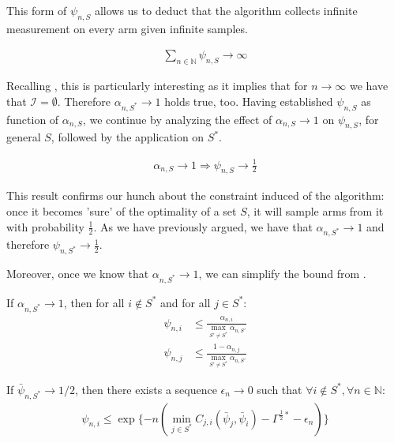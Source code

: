 This form of $\psi_{n, S}$ allows us to deduct that the algorithm collects infinite measurement on every arm given infinite samples.
\begin{lemma}\label{lemma:infinite_measurement}
  \begin{align}
    \sum_{n \in \mathbb{N}} \psi_{n, S} \rightarrow \infty
  \end{align}
\end{lemma}
Recalling , this is particularly interesting as
it implies that for $n \rightarrow \infty$ we have that $\mathcal{I} =
\emptyset$. Therefore $\alpha_{n, S^*} \rightarrow 1$ holds true, too. Having
established $\psi_{n, S}$ as function of $\alpha_{n, S}$, we continue by
analyzing the effect of $\alpha_{n, S} \rightarrow 1$ on $\psi_{n, S}$, for
general $S$, followed by the application on $S^*$.
\begin{lemma}\label{lemma:psi_convergence}
  \begin{align}
    \alpha_{n, S} \rightarrow 1 \Rightarrow \psi_{n, S} \rightarrow \frac{1}{2}
  \end{align}
\end{lemma}
This result confirms our hunch about the constraint induced of the algorithm:
once it becomes 'sure' of the optimality of a set $S$, it will sample arms from
it with probability $\frac{1}{2}$. As we have previously argued, we have that
$\alpha_{n, S^*} \rightarrow 1$ and therefore $\psi_{n, S^*} \rightarrow
\frac{1}{2}$.

Moreover, once we know that $\alpha_{n, S^*} \rightarrow 1$, we can simplify the
bound from .
\begin{lemma}\label{lemma:measurement_plan_bound_max}
  If $\alpha_{n, S^*} \rightarrow 1$, then for all $i \notin S^*$ and for all
  $j \in S^*$:
  \begin{align}
    \psi_{n, i} &\leq \frac{\alpha_{n, i}}{\max_{S' \neq S^*} \alpha_{n, S'}} \\
    \psi_{n, j} &\leq \frac{1 - \alpha_{n, j}}{\max_{S' \neq S^*} \alpha_{n,
        S'}}
  \end{align}
\end{lemma}

\begin{lemma}\label{lemma:fraction_bound}
  If $\bar{\psi}_{n, S^*} \rightarrow 1/2$, then there exists a sequence
  $\epsilon_n \rightarrow 0$ such that $\forall i \notin S^*, \forall n \in
  \mathbb{N}$:
  \begin{align}
    \psi_{n, i} \leq \exp\{-n( \min_{j \in S^*} C_{j, i}(\bar{\psi}_j,
        \bar{\psi}_i) - \Gamma^{\frac{1}{2}*} - \epsilon_n) \}
  \end{align}
\end{lemma}

